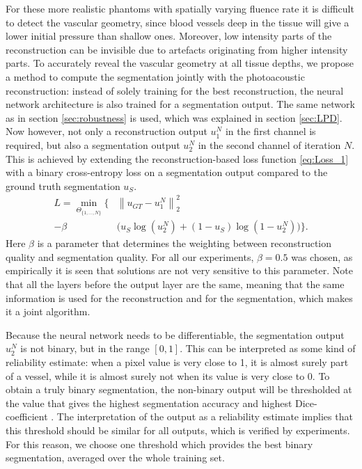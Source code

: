 \documentclass[journal]{IEEEtran}
\newcommand{\norm}[1]{\left\lVert#1\right\rVert}
\begin{document}
For these more realistic phantoms with spatially varying fluence rate it is difficult to detect the vascular geometry, since blood vessels deep in the tissue will give a lower initial pressure than shallow ones. Moreover, low intensity parts of the reconstruction can be invisible due to artefacts originating from higher intensity parts. To accurately reveal the vascular geometry at all tissue depths, we propose a method to compute the segmentation jointly with the photoacoustic reconstruction: instead of solely training for the best reconstruction, the neural network architecture is also trained for a segmentation output. {The same network as in section \ref{sec:robustness} is used, which was explained in section \ref{sec:LPD}. Now however, not only a reconstruction output $u_1^N$ in the first channel is required, but also a segmentation output $u_2^N$ in the second channel of iteration $N$.} This is achieved by extending the reconstruction-based loss function \eqref{eq:Loss_1} with a binary cross-entropy loss on a segmentation output compared to the ground truth segmentation $u_S$.
\begin{align}\label{eq:Loss_2}
L=\min_{\Theta_{\{1,\dots,N\}}}\Big\{&\norm{u_{GT}-u_1^N}^2_2 \\- \beta &\Big(u_S\log(u_2^N)+(1-u_S)\log(1-u_2^N)\Big)\Big\}.\nonumber
\end{align}
Here $\beta$ is a parameter that determines the weighting between reconstruction quality and segmentation quality. For all our experiments, $\beta=0.5$ was chosen, as empirically it is seen that solutions are not very sensitive to this parameter. {Note that all the layers before the output layer are the same, meaning that the same information is used for the reconstruction and for the segmentation, which makes it a joint algorithm.}

Because the neural network needs to be differentiable, the segmentation output $u_2^N$ is not binary, but in the range $[0,1]$. This can be interpreted as some kind of reliability estimate: when a pixel value is very close to 1, it is almost surely part of a vessel, while it is almost surely not when its value is very close to 0. To obtain a truly binary segmentation, the non-binary output will be thresholded at the value that gives the highest segmentation accuracy and highest Dice-coefficient \cite{Zijdenbos1994}. The interpretation of the output as a reliability estimate implies that this threshold should be similar for all outputs, which is verified by experiments. For this reason, we choose one threshold which provides the best binary segmentation, averaged over the whole training set.
\end{document}
